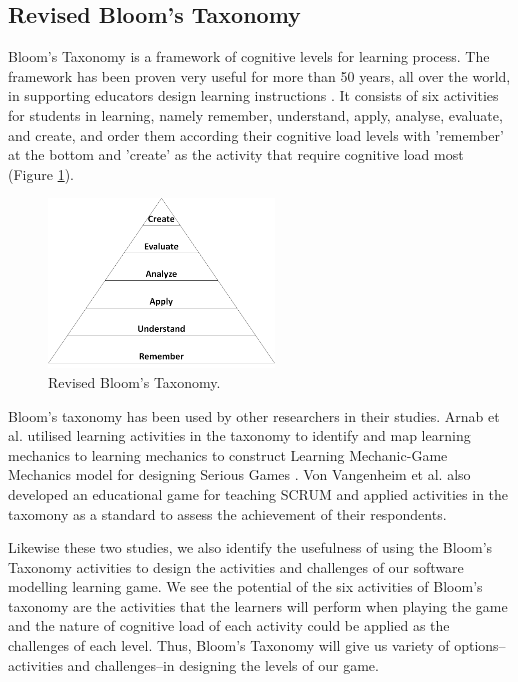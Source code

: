 \documentclass[12pt, a4paper]{report}
\begin{document}
\subsection{Revised Bloom's Taxonomy}
Bloom's Taxonomy \cite{krathwohl2002revision} is a framework of cognitive levels for learning process. The framework has been proven very useful for more than 50 years, all over the world, in supporting educators design learning instructions \cite{munzenmaier2013bloom}. It consists of six activities for students in learning, namely remember, understand, apply, analyse, evaluate, and create, and order them according their cognitive load levels with 'remember' at the bottom and 'create' as the activity that require cognitive load most (Figure \ref{bloom}). 

\begin{figure}[ht]
\centering
\includegraphics[width=6cm]{bloom}
\caption{Revised Bloom's Taxonomy\cite{krathwohl2002revision}.}
\label{bloom}
\end{figure}

Bloom's taxonomy has been used by other researchers in their studies. Arnab et al. utilised learning activities in the taxonomy to identify and map learning mechanics to learning mechanics to construct Learning Mechanic-Game Mechanics model  for designing Serious Games \cite{arnab2015mapping}. Von Vangenheim et al. \cite{von2013scrumia} also developed an educational game for teaching SCRUM and applied activities in the taxomony as a standard to assess the achievement of their respondents. 

Likewise these two studies, we also identify the usefulness of using the Bloom's Taxonomy activities to design the activities and challenges of our software modelling learning game. We see the potential of the six activities of Bloom's taxonomy are the activities that the learners will perform when playing the game and the nature of cognitive load of each activity could be applied as the challenges of each level. Thus, Bloom's Taxonomy will give us variety of options--activities and challenges--in designing the levels of our game.
\end{document}
